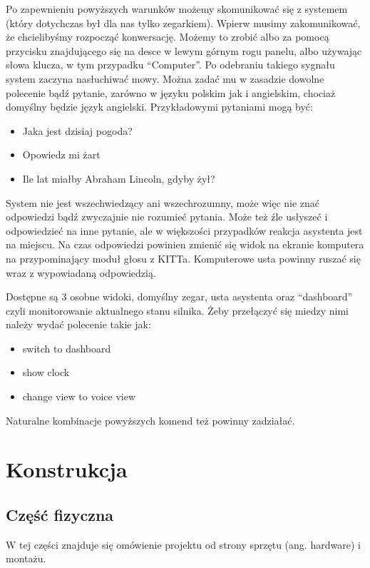\documentclass[declaration,shortabstract, inz]{iithesis}
\begin{document}
Po zapewnieniu powyższych warunków możemy skomunikować się z systemem (który dotychczas był dla nas tylko zegarkiem). Wpierw musimy zakomunikować, że chcielibyśmy rozpocząć konwersację. Możemy to zrobić albo za pomocą przycisku znajdującego się na desce w lewym górnym rogu panelu, albo używając słowa klucza, w tym przypadku ``Computer''. Po odebraniu takiego sygnału system zaczyna nasłuchiwać mowy. Można zadać mu w zasadzie dowolne polecenie bądź pytanie, zarówno w języku polskim jak i angielskim, chociaż domyślny będzie język angielski. Przykładowymi pytaniami mogą być:
\begin{itemize}
  \item Jaka jest dzisiaj pogoda?
  \item Opowiedz mi żart
  \item Ile lat miałby Abraham Lincoln, gdyby żył?
\end{itemize}
System nie jest wszechwiedzący ani wszechrozumny, może więc nie znać odpowiedzi bądź zwyczajnie nie rozumieć pytania. Może też źle usłyszeć i odpowiedzieć na inne pytanie, ale w większości przypadków reakcja asystenta jest na miejscu. Na czas odpowiedzi powinien zmienić się widok na ekranie komputera na przypominający moduł głosu z KITTa. Komputerowe usta powinny ruszać się wraz z wypowiadaną odpowiedzią.

Dostępne są 3 osobne widoki, domyślny zegar, usta asystenta oraz ``dashboard'' czyli monitorowanie aktualnego stanu silnika. Żeby przełączyć się miedzy nimi należy wydać polecenie takie jak:
\begin{itemize}
  \item switch to dashboard
  \item show clock
  \item change view to voice view
\end{itemize}
Naturalne kombinacje powyższych komend też powinny zadziałać.

\chapter{Konstrukcja}
\section{Część fizyczna}
W tej części znajduje się omówienie projektu od strony sprzętu (ang. hardware) i montażu.
\end{document}
